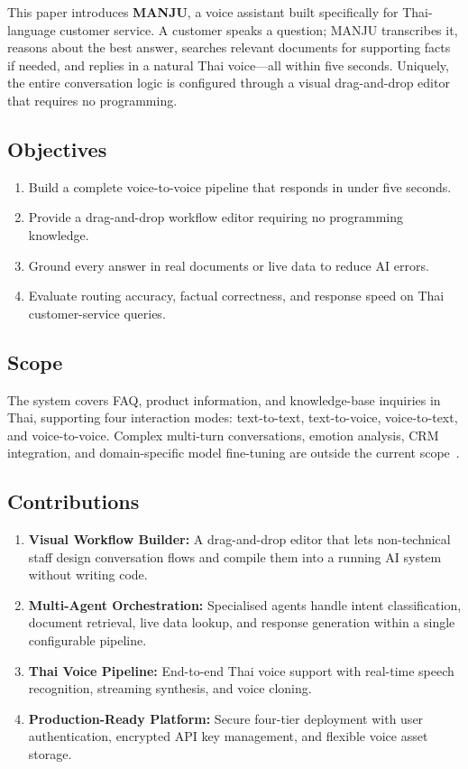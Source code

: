\documentclass[10pt, a4paper, twocolumn]{article}
\begin{document}
This paper introduces \textbf{MANJU}, a voice assistant built specifically
for Thai-language customer service.
A customer speaks a question; MANJU transcribes it, reasons about the
best answer, searches relevant documents for supporting facts if needed,
and replies in a natural Thai voice---all within five seconds.
Uniquely, the entire conversation logic is configured through a visual
drag-and-drop editor that requires no programming.

\subsection{Objectives}

\begin{enumerate}[label=(\roman*)]
    \item Build a complete voice-to-voice pipeline that responds in under five seconds.
    \item Provide a drag-and-drop workflow editor requiring no programming knowledge.
    \item Ground every answer in real documents or live data to reduce AI errors.
    \item Evaluate routing accuracy, factual correctness, and response speed on Thai customer-service queries.
\end{enumerate}

\subsection{Scope}
The system covers FAQ, product information, and knowledge-base inquiries
in Thai, supporting four interaction modes: text-to-text, text-to-voice,
voice-to-text, and voice-to-voice.
Complex multi-turn conversations, emotion analysis, CRM integration, and
domain-specific model fine-tuning are outside the current
scope~\cite{manjuProgReport}.

\subsection{Contributions}
\begin{enumerate}[label=(\roman*)]
    \item \textbf{Visual Workflow Builder:} A drag-and-drop editor that lets non-technical staff design conversation flows and compile them into a running AI system without writing code.
    \item \textbf{Multi-Agent Orchestration:} Specialised agents handle intent classification, document retrieval, live data lookup, and response generation within a single configurable pipeline.
    \item \textbf{Thai Voice Pipeline:} End-to-end Thai voice support with real-time speech recognition, streaming synthesis, and voice cloning.
    \item \textbf{Production-Ready Platform:} Secure four-tier deployment with user authentication, encrypted API key management, and flexible voice asset storage.
\end{enumerate}
\end{document}
